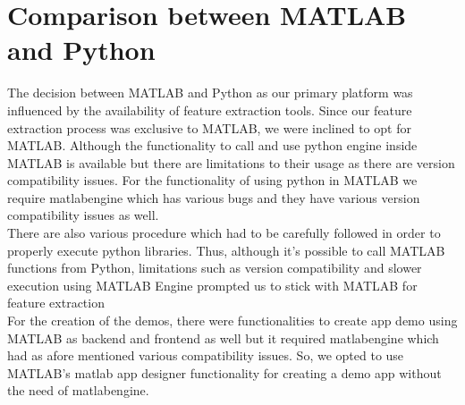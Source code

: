 \section{Comparison between MATLAB and Python}
The decision between MATLAB and Python as our primary platform was influenced by the availability of feature extraction tools. Since our feature extraction process was exclusive to MATLAB, we were inclined to opt for MATLAB. Although the functionality to call and use python engine inside MATLAB is available but there are limitations to their usage as there are version compatibility issues. For the functionality of using python in MATLAB we require matlabengine which has various bugs and they have various version compatibility issues as well.\\
There are also various procedure which had to be carefully followed in order to properly execute python libraries. 
Thus, although it’s possible to call MATLAB functions from Python, limitations such as version compatibility and slower execution using MATLAB Engine prompted us to stick with MATLAB for feature extraction\\
For the creation of the demos, there were functionalities to create app demo using MATLAB as backend and frontend as well but it required matlabengine which had as afore mentioned various compatibility issues. So, we opted to use MATLAB's matlab app designer functionality for creating a demo app without the need of matlabengine.










